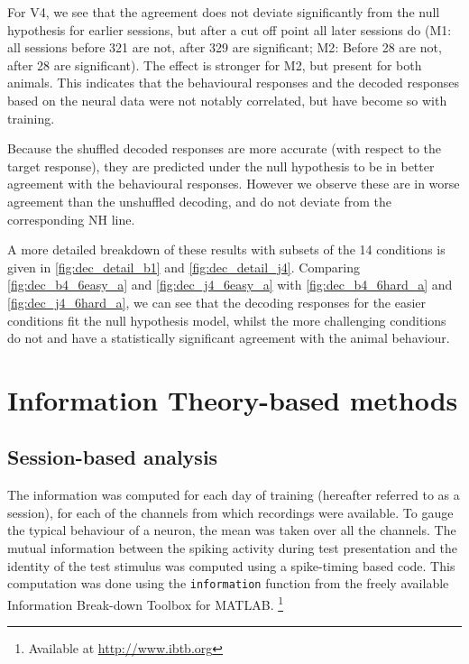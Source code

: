 For \ac{V4}, we see that the agreement does not deviate significantly from the null hypothesis for earlier sessions, but after a cut off point all later sessions do (\ac{M1}: all sessions before 321 are not, after 329 are significant; \ac{M2}: Before 28 are not, after 28 are significant).
The effect is stronger for \ac{M2}, but present for both animals.
This indicates that the behavioural responses and the decoded responses based on the neural data were not notably correlated, but have become so with training.

Because the shuffled decoded responses are more accurate (with respect to the target response), they are predicted under the null hypothesis to be in better agreement with the behavioural responses.
However we observe these are in worse agreement than the unshuffled decoding, and do not deviate from the corresponding NH line.

A more detailed breakdown of these results with subsets of the 14 conditions is given in \autoref{fig:dec_detail_b1} and \autoref{fig:dec_detail_j4}.
Comparing \autoref{fig:dec_b4_6easy_a} and \autoref{fig:dec_j4_6easy_a} with \autoref{fig:dec_b4_6hard_a} and \autoref{fig:dec_j4_6hard_a}, we can see that the decoding responses for the easier conditions fit the null hypothesis model, whilst the more challenging conditions do not and have a statistically significant agreement with the animal behaviour.


\FloatBarrier
\section{Information Theory-based methods}

\subsection{Session-based analysis}

The information was computed for each day of training (hereafter referred to as a session), for each of the channels from which recordings were available.
To gauge the typical behaviour of a neuron, the mean was taken over all the channels.
The mutual information between the spiking activity during test presentation and the identity of the test stimulus was computed
using a spike-timing based code.
This computation was done using the \verb|information| function from the freely available Information Break-down Toolbox \citep{Magri2009} for MATLAB.%
\footnote{Available at \url{http://www.ibtb.org}}

